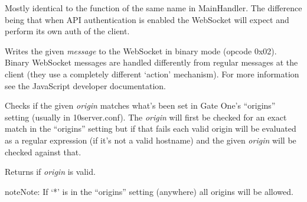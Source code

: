 \documentclass[letterpaper,10pt,openany]{sphinxmanual}
\begin{document}
\begin{fulllineitems}
\begin{fulllineitems}
\end{fulllineitems}


\begin{fulllineitems}
\label{Developer/server:gateone.core.server.ApplicationWebSocket.get_current_user}
Mostly identical to the function of the same name in MainHandler.  The
difference being that when API authentication is enabled the WebSocket
will expect and perform its own auth of the client.

\end{fulllineitems}


\begin{fulllineitems}
\label{Developer/server:gateone.core.server.ApplicationWebSocket.write_binary}
Writes the given \emph{message} to the WebSocket in binary mode (opcode
0x02).  Binary WebSocket messages are handled differently from regular
messages at the client (they use a completely different `action'
mechanism).  For more information see the JavaScript developer
documentation.

\end{fulllineitems}


\begin{fulllineitems}
\label{Developer/server:gateone.core.server.ApplicationWebSocket.check_origin}
Checks if the given \emph{origin} matches what's been set in Gate One's
``origins'' setting (usually in 10server.conf).  The \emph{origin} will first
be checked for an exact match in the ``origins'' setting but if that fails
each valid origin will be evaluated as a regular expression (if it's not
a valid hostname) and the given \emph{origin} will be checked against that.

Returns  if \emph{origin} is valid.

\begin{notice}{note}{Note:}
If `*' is in the ``origins'' setting (anywhere) all origins will be
allowed.
\end{notice}


\end{fulllineitems}
\end{fulllineitems}
\end{document}
